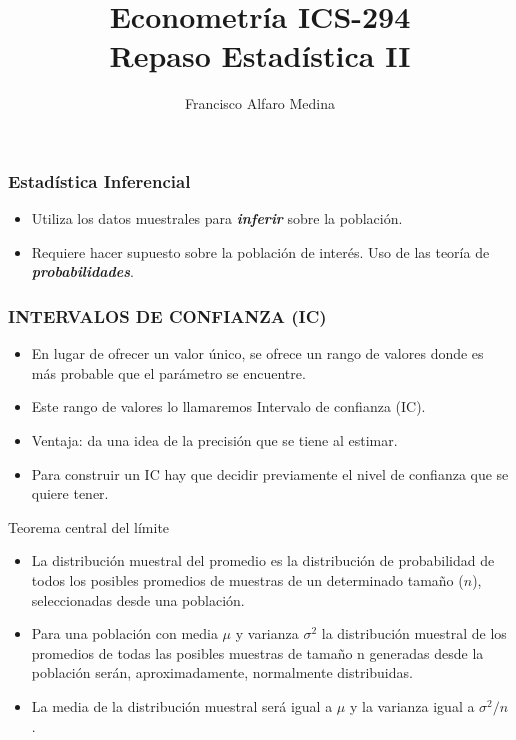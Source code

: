 \documentclass{beamer}
\title[ICS-294]{Econometría ICS-294\\ \small{Repaso Estadística II}}
\author{Francisco Alfaro Medina}
\institute[USM]
{Universidad Técnica Federico Santa María\\ %
	\medskip
	\textit{} %
	
}
\date{}
\begin{document}
\begin{frame}
	\titlepage %
\end{frame}

\begin{frame}
\frametitle{Estadística  Inferencial}

\begin{itemize}
\item  Utiliza los datos muestrales para \textit{\textbf{inferir}} sobre la población.
\item Requiere hacer supuesto sobre la población de interés. Uso de
las teoría de \textit{\textbf{probabilidades}}.
\end{itemize}
\end{frame}

\begin{frame}

\frametitle{INTERVALOS DE CONFIANZA (IC)}
\begin{itemize}
\item En lugar de ofrecer un valor único, se ofrece un rango de valores donde es más probable que el parámetro se encuentre.
\item Este rango de valores lo llamaremos Intervalo de confianza (IC).
\item Ventaja: da una idea de la precisión que se tiene al estimar.
\item Para construir un IC hay que decidir previamente el nivel de confianza que se quiere tener.
\end{itemize}
\end{frame}



\begin{frame}{Teorema central del l\'imite }
    \begin{itemize}
% 
    \item La distribución muestral del promedio es la distribución de probabilidad de todos los posibles promedios de muestras de un determinado tamaño ($n$), seleccionadas desde una población.
        \item Para una población con media $\mu$ y varianza $\sigma^2$ la distribución muestral de los promedios de todas las posibles muestras de tamaño n generadas desde la población serán, aproximadamente, normalmente distribuidas.
        
\item La media de la distribución muestral será igual a $\mu$ y la varianza  igual a $\sigma^2/n$.
    \end{itemize}
\end{frame}
\end{document}
